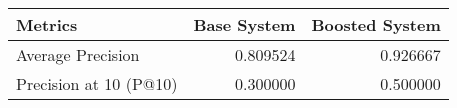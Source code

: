\begin{tabular}{lrr}
\toprule
               Metrics &  Base System &  Boosted System \\
\midrule
     Average Precision &     0.809524 &        0.926667 \\
Precision at 10 (P@10) &     0.300000 &        0.500000 \\
\bottomrule
\end{tabular}

